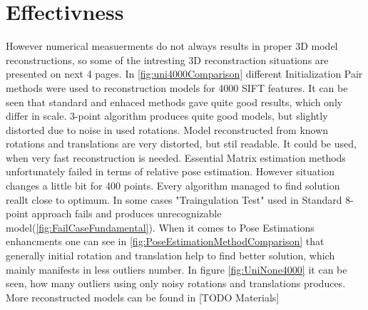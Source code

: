 \section{Effectivness}
However numerical measuerments do not always results in proper 3D model reconstructions, so some of the intresting 3D reconstraction situations are presented on next 4 pages. In \ref{fig:uni4000Comparison} different Initialization Pair methods were used to reconstruction models for 4000 SIFT features. It can be seen that standard and enhaced methods gave quite good results, which only differ in scale. 3-point algorithm produces quite good models, but slightly distorted due to noise in used rotations. Model reconstructed from known rotations and translations are very distorted, but stil readable. It could be used, when very fast reconstruction is needed. Essential Matrix estimation methods unfortunately failed in terms of relative pose estimation.
\newline
However situation changes a little bit for 400 points. Every algorithm managed to find solution reallt close to optimum. In some cases "Traingulation Test" used in Standard 8-point approach fails and produces unrecognizable model(\ref{fig:FailCaseFundamental}).
\newline
When it comes to Pose Estimations enhancments one can see in \ref{fig:PoseEstimationMethodComparison} that generally initial  rotation and translation help to find better solution, which mainly manifests in less outliers number.
\newline
In figure \ref{fig:UniNone4000} it can be seen, how many outliers using only noisy rotations and translations produces.
\newline
More reconstructed models can be found in [TODO Materials]
